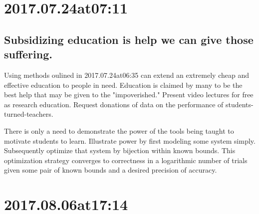 \begin{enumerate}
\begin{enumerate}
\section*{ 2017.07.24at07:11 }
\subsection*{ Subsidizing education is help we can give those suffering. }
Using methods oulined in 2017.07.24at06:35 can extend an extremely cheap and effective education to people in need. Education is claimed by many to be the best help that may be given to the "impoverished." Present video lectures for free as research education. Request donations of data on the performance of students-turned-teachers.

There is only a need to demonstrate the power of the tools being taught to motivate students to learn. Illustrate power by first modeling some system simply. Subsequently optimize that system by bijection within known bounds. This optimization strategy converges to correctness in a logarithmic number of trials given some pair of known bounds and a desired precision of accuracy.

\section*{ 2017.08.06at17:14 }

\end{enumerate}
\end{enumerate}
